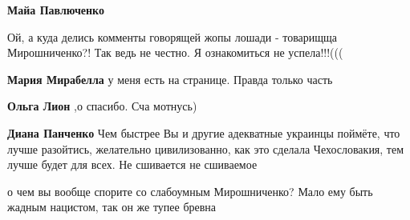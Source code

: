 \begin{itemize}
\begin{itemize}
 
\textbf{Майа Павлюченко} 💐

 
Ой, а куда делись комменты говорящей жопы лошади - товарищща Мирошниченко?! Так ведь не честно. Я ознакомиться не успела!!!(((

 
\textbf{Мария Мирабелла} у меня есть на странице. Правда только часть

 
\textbf{Ольга Лион} ,о спасибо. Сча мотнусь)

 
\textbf{Диана Панченко} Чем быстрее Вы и другие адекватные украинцы поймёте, что
лучше разойтись, желательно цивилизованно, как это сделала Чехословакия, тем лучше
будет для всех. Не сшивается не сшиваемое

 
о чем вы вообще спорите со слабоумным Мирошниченко? Мало ему быть жадным нацистом, так он же тупее бревна


\end{itemize}
\end{itemize}
